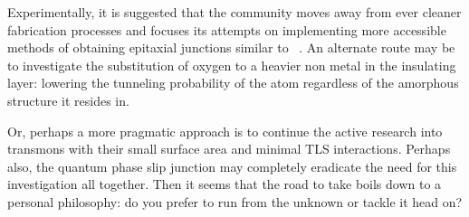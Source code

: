 Experimentally, it is suggested that the community moves away from ever cleaner fabrication processes and focuses its attempts on implementing more accessible methods of obtaining epitaxial junctions similar to \citeauthor{Oh2006}~\cite{Oh2006}.
An alternate route may be to investigate the substitution of oxygen to a heavier non metal in the insulating layer: lowering the tunneling probability of the atom regardless of the amorphous structure it resides in.

Or, perhaps a more pragmatic approach is to continue the active research into transmons with their small surface area and minimal TLS interactions.
Perhaps also, the quantum phase slip junction may completely eradicate the need for this investigation all together.
Then it seems that the road to take boils down to a personal philosophy: do you prefer to run from the unknown or tackle it head on?
\begin{center}
\resizebox{!}{1cm}{}
\end{center}
